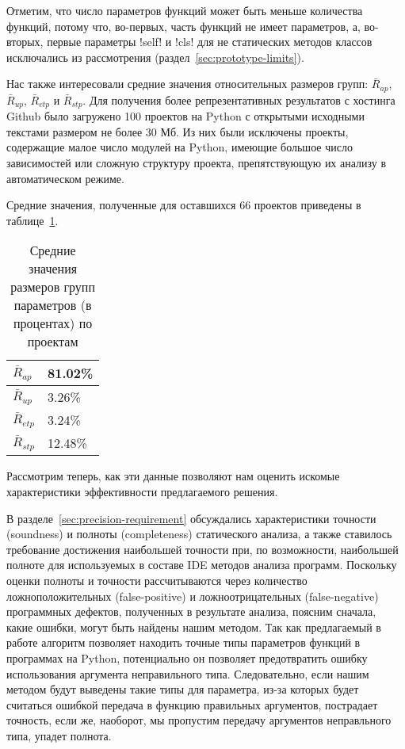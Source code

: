 Отметим, что число параметров функций может быть меньше количества функций,
потому что, во-первых, часть функций не имеет параметров, а, во-вторых, первые
параметры !self! и !cls! для не статических методов классов исключались из
рассмотрения (раздел~\ref{sec:prototype-limits}).

Нас также интересовали средние значения относительных размеров групп: $\bar{R}_{ap}$,
$\bar{R}_{up}$, $\bar{R}_{etp}$ и $\bar{R}_{stp}$. Для получения более
репрезентативных результатов с хостинга Github было загружено 100 проектов на
Python с открытыми исходными текстами размером не более 30 Мб. Из них были
исключены проекты, содержащие малое число модулей на Python, имеющие большое
число зависимостей или сложную структуру проекта, препятствующую их анализу в
автоматическом режиме. 

Средние значения, полученные для оставшихся 66 проектов приведены в
таблице~\ref{tab:statistics-results-2}.

\begin{table}[H]
  \small
  \caption{Средние значения размеров групп параметров (в процентах) по проектам}
  \label{tab:statistics-results-2}
  \centering
  \begin{tabularx}{0.5\textwidth}{ |X|X| }

    \hline
    $\bar{R}_{ap}$ & 81.02\% \\ \hline

    $\bar{R}_{up}$ & 3.26\% \\ \hline

    $\bar{R}_{etp}$ & 3.24\% \\ \hline

    $\bar{R}_{stp}$ & 12.48\% \\ \hline

  \end{tabularx}
\end{table} 

Рассмотрим теперь, как эти данные позволяют нам оценить искомые характеристики
эффективности предлагаемого решения.

В разделе~\ref{sec:precision-requirement} обсуждались характеристики точности
(soundness) и полноты (completeness) статического анализа, а также ставилось
требование достижения наибольшей точности при, по возможности, наибольшей
полноте для используемых в составе IDE методов анализа программ. Поскольку
оценки полноты и точности рассчитываются через количество ложноположительных
(false-positive) и ложноотрицательных (false-negative) программных дефектов,
полученных в результате анализа, поясним сначала, какие ошибки, могут быть
найдены нашим методом.  Так как предлагаемый в работе алгоритм позволяет
находить точные типы параметров функций в программах на Python, потенциально он
позволяет предотвратить ошибку использования аргумента неправильного типа.
Следовательно, если нашим методом будут выведены такие типы для параметра, из-за
которых будет считаться ошибкой передача в функцию правильных аргументов,
пострадает точность, если же, наоборот, мы пропустим передачу аргументов
неправльного типа, упадет полнота.


